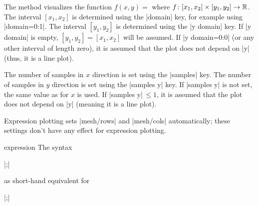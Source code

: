 {\begin{addplot3operation}[]{}{}
    The method   visualizes the function
    $f(x,y) = $ where $ f \colon [x_1,x_2] \times [y_1,y_2] \to
    \mathbb{R}$. The interval $[x_1,x_2]$ is determined using the |domain| key, for
    example using |domain=0:1|. The interval $[y_1,y_2]$ is determined using
    the |y domain| key. If |y domain| is empty, $[y_1,y_2] = [x_1,x_2]$ will be
    assumed. If |y domain=0:0| (or any other interval of length zero), it is
    assumed that the plot does not depend on |y| (thus, it is a line plot).

    The number of samples in $x$ direction is set using the |samples| key. The
    number of samples in $y$ direction is set using the |samples y| key. If
    |samples y| is not set, the same value as for $x$ is used. If
    |samples y|$\,\le 1$, it is assumed that the plot does not depend on |y|
    (meaning it is a line plot).

\pgfplotsexpensiveexample
\begin{codeexample}[]
\end{codeexample}

\pgfplotsexpensiveexample
\begin{codeexample}[]
\end{codeexample}

    Expression plotting sets |mesh/rows| and |mesh/cols| automatically; these
    settings don't have any effect for expression plotting.
\end{addplot3operation}

\begin{addplot3operation}[]{expression}{}
    The syntax

     |;|

    as short-hand equivalent for

     |;|
\end{addplot3operation}

}

